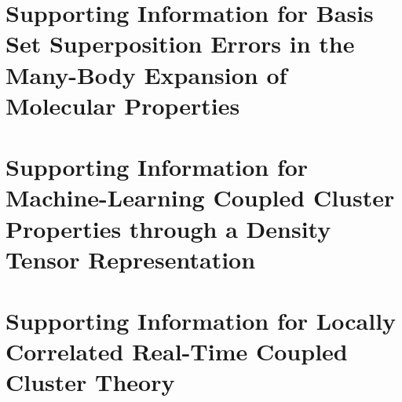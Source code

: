 \documentclass[doublespace]{VTthesis} %
\begin{document}
	\appendix
	\begin{appendices}
		\chapter{Supporting Information for Basis Set Superposition Errors in the Many-Body Expansion of Molecular Properties} \label{si:mbe}
        
        \chapter{Supporting Information for Machine-Learning Coupled Cluster Properties through a Density Tensor Representation} \label{si:ml}
        
        \chapter{Supporting Information for Locally Correlated Real-Time Coupled Cluster Theory}
        
	\end{appendices}
\end{document}
